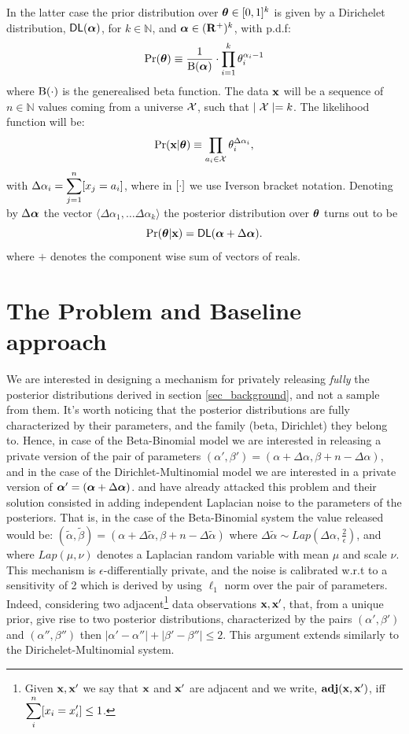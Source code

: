 \documentclass[sigconf, anonymous]{acmart}
\begin{document}
In the latter case the prior distribution over $\boldsymbol{\theta}\in [0,1]^{k}$ is given by a Dirichelet distribution, $\mathsf{DL}(\boldsymbol{\alpha})$, for $k\in\mathbb{N}$,
and $\boldsymbol{\alpha}\in(\mathbf{R^{+}})^{k}$, with p.d.f:
\[
  \Pr(\boldsymbol{\theta})\equiv\frac{1}{\boldsymbol{\textup{B}}(\boldsymbol{\alpha})}\cdot \displaystyle\prod_{i=1}^{k}{\theta_i^{\alpha_i-1}}
\]
where $\boldsymbol{\textup{B}}(\cdot)$ is the generealised beta function.
The data $\textbf{x}$ will be a sequence of $n\in\mathbb{N}$ values coming from a universe $\mathcal{X}$, such that $\mid\mathcal{X} \mid=k$.
The likelihood function will be:
\[
  \Pr(\textbf{x}|\boldsymbol{\theta})\equiv \displaystyle\prod_{a_i\in\mathcal{X}}\theta_{i}^{\Delta \alpha_i},
\]
with $\Delta \alpha_i=\displaystyle\sum_{j=1}^{n}[x_j=a_i]$, where in $[\cdot]$ we use
Iverson bracket notation. Denoting by $\Delta\boldsymbol{\alpha}$ the vector $\langle  \Delta\alpha_1,\dots \Delta\alpha_k \rangle$ the posterior distribution over $\boldsymbol{\theta}$ turns out to be
\[
  \Pr(\boldsymbol{\theta}|\textbf{x})=\mathsf{DL}(\boldsymbol{\alpha}+\Delta \boldsymbol{\alpha}). 
\]
where $+$ denotes the component wise  sum of vectors of reals. 


\section{The Problem and Baseline approach}
We are interested in designing a mechanism for privately releasing
\emph{fully} the posterior distributions derived in section \ref{sec_background},
and not a sample from them.  It's worth noticing that the posterior
distributions are fully characterized by their parameters, and the
family (beta, Dirichlet) they belong to.  Hence, in case of the
Beta-Binomial model we are interested in releasing a private version
of the pair of parameters $(\alpha',\beta')=(\alpha + \Delta \alpha,\beta + n - \Delta \alpha)$, and
in the case of the Dirichlet-Multinomial model we are interested in a
private version of $\boldsymbol{\alpha}'=(\boldsymbol{\alpha} + \Delta \boldsymbol{\alpha})$. \citet{zhang2016differential} and \citet{xiao2012bayesian} have
already attacked this problem and their solution consisted in adding
independent Laplacian noise to the parameters of the posteriors. That
is, in the case of the Beta-Binomial system the value released would
be: $(\tilde\alpha,\tilde\beta)=(\alpha + \Delta \tilde\alpha,\beta + n - \Delta \tilde\alpha)$ where $\Delta \tilde\alpha\sim Lap(\Delta \alpha, \frac{2}{\epsilon})$, and
where $Lap(\mu,\nu)$
denotes a Laplacian random variable with mean $\mu$ and scale $\nu$.
This mechanism is $\epsilon$-differentially private, and the noise is
calibrated w.r.t to a sensitivity of 2 which is derived by using
$\ell_1$ norm over the pair of parameters. Indeed, considering two
adjacent\footnote{Given $\textbf{x}, \textbf{x}'$  we say that $\textbf{x}$ and $\textbf{x}'$ are adjacent and we write, $\textbf{adj}(\textbf{x},\textbf{x}')$, iff\\
$\displaystyle \sum_{i}^{n}[x_i = x'_i ]\leq 1$. } data observations
$\textbf{x}, \textbf{x}'$, that, from a unique prior, give rise to two posterior
distributions, characterized by the pairs
$(\alpha',\beta')$ and $(\alpha'',\beta'')$ then
$|\alpha'-\alpha''|+|\beta'-\beta''|\leq 2$.
This argument extends similarly to the Dirichelet-Multinomial system.
\end{document}
